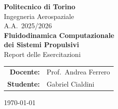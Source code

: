 \documentclass[12pt, a4paper]{report}
\begin{document}
\begin{titlepage}
  \centering
  \vspace*{1cm}
  {\Large\bfseries Politecnico di Torino}\\[0.3cm]
  {\large Ingegneria Aerospaziale}\\[0.1cm]
  {\large A.A.\ 2025/2026}\\[2.5cm]

  {\Huge\bfseries Fluidodinamica Computazionale\\[0.4cm]
  dei Sistemi Propulsivi}\\[0.5cm]
  {\large Report delle Esercitazioni}\\[3cm]

  \begin{tabular}{rl}
    \textbf{Docente:} & Prof.\ Andrea Ferrero \\[0.3cm]
    \textbf{Studente:} & Gabriel Cialdini\\
  \end{tabular}

  \vfill
  {\large \today}
\end{titlepage}

\tableofcontents
\listoffigures
\listoftables
\clearpage






\end{document}
